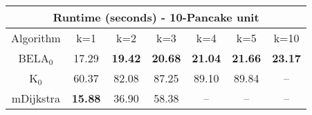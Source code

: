 \begin{tabular}{c|cccccc}\toprule
\multicolumn{7}{c}{Runtime (seconds) - 10-Pancake unit}\\ \midrule
Algorithm & k=1 & k=2 & k=3 & k=4 & k=5 & k=10 \\ \midrule
BELA$_0$ & 17.29 & \textbf{19.42} & \textbf{20.68} & \textbf{21.04} & \textbf{21.66} & \textbf{23.17} \\
K$_0$ & 60.37 & 82.08 & 87.25 & 89.10 & 89.84 & -- \\
mDijkstra & \textbf{15.88} & 36.90 & 58.38 & -- & -- & -- \\ \bottomrule 
\end{tabular}
